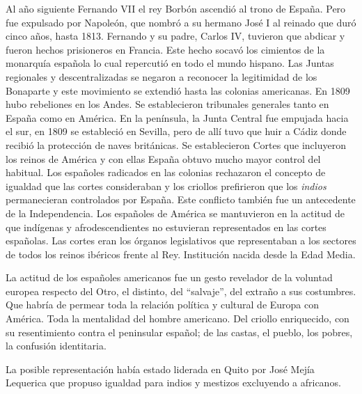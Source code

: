 Al año siguiente Fernando VII el rey Borbón
ascendió al trono de España. Pero fue
expulsado por Napoleón, que nombró a su
hermano José I al reinado que duró cinco
años, hasta 1813. Fernando y su padre, Carlos
IV, tuvieron que abdicar y fueron hechos
prisioneros en Francia. Este hecho socavó los
cimientos de la monarquía española lo cual
repercutió en todo el mundo hispano. Las
Juntas regionales y descentralizadas se
negaron a reconocer la legitimidad de los
Bonaparte y este movimiento se extendió hasta
las colonias americanas. En 1809 hubo
rebeliones en los Andes. Se establecieron
tribunales generales tanto en España como en
América. En la península, la Junta Central
fue empujada hacia el sur, en 1809 se
estableció en Sevilla, pero de allí tuvo que
huir a Cádiz donde recibió la protección de
naves británicas. Se establecieron Cortes que
incluyeron los reinos de América y con ellas
España obtuvo mucho mayor control del
habitual. Los españoles radicados en las
colonias rechazaron el concepto de igualdad
que las cortes consideraban y los criollos
prefirieron que los \emph{indios}
permanecieran controlados por España. Este
conflicto también fue un antecedente de la
Independencia. Los españoles de América se
mantuvieron en la actitud de que indígenas y
afrodescendientes no estuvieran representados
en las cortes españolas. Las cortes eran los
órganos legislativos que representaban a los
sectores de todos los reinos ibéricos frente
al Rey. Institución nacida desde la Edad
Media.

La actitud de los españoles americanos fue un
gesto revelador de la voluntad europea
respecto del Otro, el distinto, del
“salvaje”, del extraño a sus costumbres. Que
habría de permear toda la relación política y
cultural de Europa con América. Toda la
mentalidad del hombre americano. Del criollo
enriquecido, con su resentimiento contra el
peninsular español; de las castas, el pueblo,
los pobres, la confusión identitaria.

La posible representación había estado
liderada en Quito por José Mejía Lequerica
que propuso igualdad para indios y mestizos
excluyendo a africanos.


